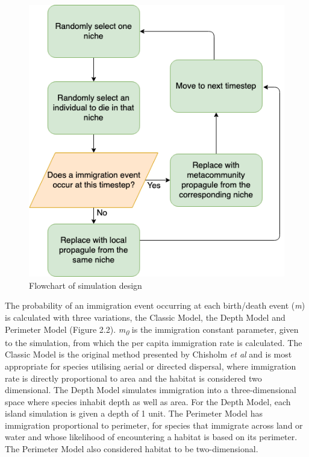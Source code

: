  \begin{figure}[h!]
\centering
  \includegraphics[scale=0.5]{SimFlow.png}
  \caption{Flowchart of simulation design}
  \label{fig:Flowchart}
\end{figure}

\noindent The probability of an immigration event occurring at each birth/death event (\textit{m}) is calculated with three variations, the Classic Model, the Depth Model and Perimeter Model (Figure 2.2). \textit{m\textsubscript{0}} is the immigration constant parameter, given to the simulation, from which the per capita immigration rate is calculated. The Classic Model is the original method presented by Chisholm \textit{et al} and is most appropriate for species utilising aerial or directed dispersal, where immigration rate is directly proportional to area and the habitat is considered two dimensional. The Depth Model simulates immigration into a three-dimensional space where species inhabit depth as well as area. For the Depth Model, each island simulation is given a depth of 1 unit. The Perimeter Model has immigration proportional to perimeter, for species that immigrate across land or water and whose likelihood of encountering a habitat is based on its perimeter. The Perimeter Model also considered habitat to be two-dimensional. \\


